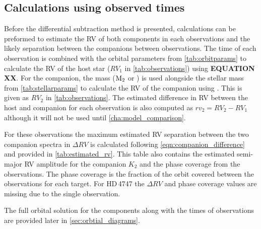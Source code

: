 \subsection{Calculations using observed times}
{\red{}
Before the differential subtraction method is presented, calculations can be preformed to estimate the RV of both components in each observations and the likely separation between the companions between observations.
The time of each observation is combined with the orbital parameters from \cref{tab:orbitparams} to calculate the RV of the host star (\({RV}_{1}\) in \cref{tab:observations}) using \textbf{EQUATION XX}.
For the companion, the mass ($\textrm{M}_{2}{}$ or \mtwosini{})  is used alongside the stellar mass from \cref{tab:stellarparams} to calculate the RV of the companion using . This is given as \({RV}_{2}\) in \cref{tab:observations}.
The estimated difference in RV between the host and companion for each observation is also computed as \({rv}_{2} = {RV}_{2}-{RV}_{1}\) although it will not be used until \cref{cha:model_comparison}.

For these observations the maximum estimated RV separation between the two companion spectra in  \(\Delta RV\) is calculated following \cref{eqn:companion_difference} and provided in \cref{tab:estimated_rv}.
This table also contains the estimated semi-major RV amplitude for the companion \(K_2\) and the phase coverage from the observations.
The phase coverage is the fraction of the orbit covered between the observations for each target.
For {HD\,4747} the \(\Delta RV\) and phase coverage values are missing due to the single observation.
}



The full orbital solution for the components along with the times of observations are provided later in \cref{sec:orbtial_diagrams}.


